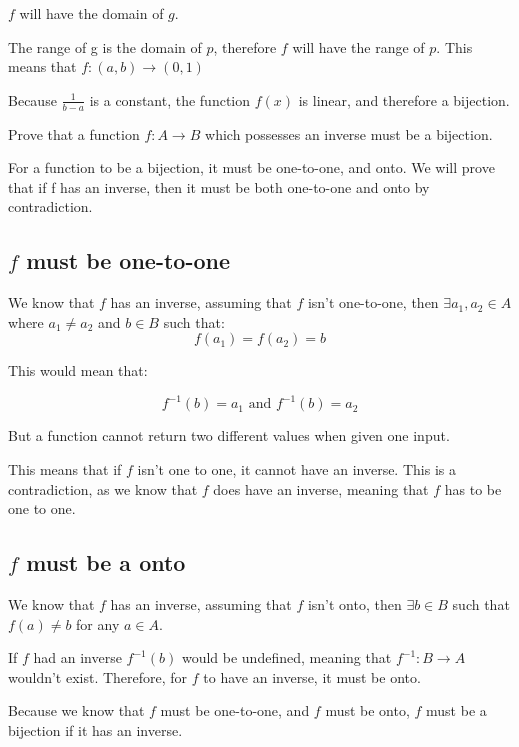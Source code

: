 \documentclass[12pt]{article} %
\begin{document}
\begin{homeworkProblem}
    $f$ will have the domain of $g$.

    The range of g is the domain of $p$, therefore $f$ will have the range of $p$. This means that $f: (a, b) \rightarrow (0, 1)$

    Because $\frac{1}{b - a}$ is a constant, the function $f(x)$ is linear, and therefore a bijection.

\end{homeworkProblem}

\pagebreak

\begin{homeworkProblem}
    \begin{grayBoxed}
        Prove that a function $f: A \rightarrow B$ which possesses an inverse must be a bijection.
    \end{grayBoxed}

    For a function to be a bijection, it must be one-to-one, and onto. We will prove that if f has an inverse, then it must be both one-to-one and onto by contradiction.

    \subsection*{$f$ must be one-to-one}

    We know that $f$ has an inverse, assuming that $f$ isn't one-to-one, then $\exists a_1, a_2 \in A$ where $a_1 \not = a_2$ and $b \in B$ such that:
    $$
        f(a_1) = f(a_2) = b
    $$

    This would mean that:

    $$
        f^{-1}(b) = a_1 \text{ and } f^{-1}(b) = a_2
    $$

    But a function cannot return two different values when given one input.

    This means that if $f$ isn't one to one, it cannot have an inverse. This is a contradiction, as we know that $f$ does have an inverse, meaning that $f$ has to be one to one.

    \subsection*{$f$ must be a onto}

    We know that $f$ has an inverse, assuming that $f$ isn't onto, then $\exists b \in B$ such that $f(a) \not = b$ for any $a \in A$.

    If $f$ had an inverse $f^{-1}(b)$ would be undefined, meaning that $f^{-1}: B \rightarrow A$ wouldn't exist. Therefore,
    for $f$ to have an inverse, it must be onto.

    \vspace*{10mm}

    Because we know that $f$ must be one-to-one, and $f$ must be onto, $f$ must be a bijection if it has an inverse.


\end{homeworkProblem}
\end{document}
